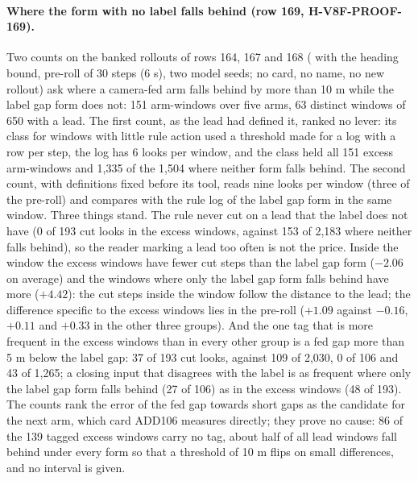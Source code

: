 \paragraph{Where the form with no label falls behind (row 169, H-V8F-PROOF-169).} Two counts on the banked rollouts of rows 164, 167 and 168 ( with the heading bound, pre-roll of 30 steps (6 s), two model seeds; no card, no name, no new rollout) ask where a camera-fed arm falls behind by more than 10 m while the label gap form does not: 151 arm-windows over five arms, 63 distinct windows of 650 with a lead. The first count, as the lead had defined it, ranked no lever: its class for windows with little rule action used a threshold made for a log with a row per step, the log has 6 looks per window, and the class held all 151 excess arm-windows and 1,335 of the 1,504 where neither form falls behind. The second count, with definitions fixed before its tool, reads nine looks per window (three of the pre-roll) and compares with the rule log of the label gap form in the same window. Three things stand. The rule never cut on a lead that the label does not have (0 of 193 cut looks in the excess windows, against 153 of 2,183 where neither falls behind), so the reader marking a lead too often is not the price. Inside the window the excess windows have fewer cut steps than the label gap form ($-2.06$ on average) and the windows where only the label gap form falls behind have more ($+4.42$): the cut steps inside the window follow the distance to the lead; the difference specific to the excess windows lies in the pre-roll ($+1.09$ against $-0.16$, $+0.11$ and $+0.33$ in the other three groups). And the one tag that is more frequent in the excess windows than in every other group is a fed gap more than 5 m below the label gap: 37 of 193 cut looks, against 109 of 2,030, 0 of 106 and 43 of 1,265; a closing input that disagrees with the label is as frequent where only the label gap form falls behind (27 of 106) as in the excess windows (48 of 193). The counts rank the error of the fed gap towards short gaps as the candidate for the next arm, which card ADD106 measures directly; they prove no cause: 86 of the 139 tagged excess windows carry no tag, about half of all lead windows fall behind under every form so that a threshold of 10 m flips on small differences, and no interval is given.

